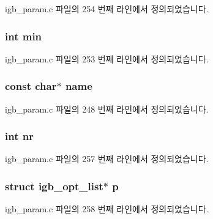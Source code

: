 igb\+\_\+param.\+c 파일의 254 번째 라인에서 정의되었습니다.

\subsubsection[{\texorpdfstring{min}{min}}]{\setlength{\rightskip}{0pt plus 5cm}int min}\hypertarget{structigb__option_a3e202b201e6255d975cd6d3aff1f5a4d}{}\label{structigb__option_a3e202b201e6255d975cd6d3aff1f5a4d}


igb\+\_\+param.\+c 파일의 253 번째 라인에서 정의되었습니다.

\subsubsection[{\texorpdfstring{name}{name}}]{\setlength{\rightskip}{0pt plus 5cm}const char$\ast$ name}\hypertarget{structigb__option_a8f8f80d37794cde9472343e4487ba3eb}{}\label{structigb__option_a8f8f80d37794cde9472343e4487ba3eb}


igb\+\_\+param.\+c 파일의 248 번째 라인에서 정의되었습니다.

\subsubsection[{\texorpdfstring{nr}{nr}}]{\setlength{\rightskip}{0pt plus 5cm}int nr}\hypertarget{structigb__option_a2833bf188e6bf292fa7d61e2dd54d622}{}\label{structigb__option_a2833bf188e6bf292fa7d61e2dd54d622}


igb\+\_\+param.\+c 파일의 257 번째 라인에서 정의되었습니다.

\subsubsection[{\texorpdfstring{p}{p}}]{\setlength{\rightskip}{0pt plus 5cm}struct {\bf igb\+\_\+opt\+\_\+list}$\ast$ p}\hypertarget{structigb__option_aba77a6381efa5ce25704c47bdffd20cb}{}\label{structigb__option_aba77a6381efa5ce25704c47bdffd20cb}


igb\+\_\+param.\+c 파일의 258 번째 라인에서 정의되었습니다.


